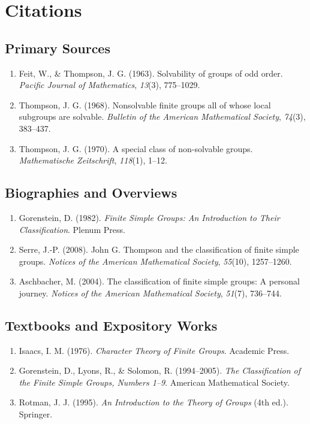 \section{Citations}

\subsection*{Primary Sources}
\begin{enumerate}
    \item Feit, W., \& Thompson, J. G. (1963). Solvability of groups of odd order. \textit{Pacific Journal of Mathematics}, \textit{13}(3), 775--1029.
    \item Thompson, J. G. (1968). Nonsolvable finite groups all of whose local subgroups are solvable. \textit{Bulletin of the American Mathematical Society}, \textit{74}(3), 383--437.
    \item Thompson, J. G. (1970). A special class of non-solvable groups. \textit{Mathematische Zeitschrift}, \textit{118}(1), 1--12.
\end{enumerate}

\subsection*{Biographies and Overviews}
\begin{enumerate}
    \item Gorenstein, D. (1982). \textit{Finite Simple Groups: An Introduction to Their Classification}. Plenum Press.
    \item Serre, J.-P. (2008). John G. Thompson and the classification of finite simple groups. \textit{Notices of the American Mathematical Society}, \textit{55}(10), 1257--1260.
    \item Aschbacher, M. (2004). The classification of finite simple groups: A personal journey. \textit{Notices of the American Mathematical Society}, \textit{51}(7), 736--744.
\end{enumerate}

\subsection*{Textbooks and Expository Works}
\begin{enumerate}
    \item Isaacs, I. M. (1976). \textit{Character Theory of Finite Groups}. Academic Press.
    \item Gorenstein, D., Lyons, R., \& Solomon, R. (1994--2005). \textit{The Classification of the Finite Simple Groups, Numbers 1--9}. American Mathematical Society.
    \item Rotman, J. J. (1995). \textit{An Introduction to the Theory of Groups} (4th ed.). Springer.
\end{enumerate}
